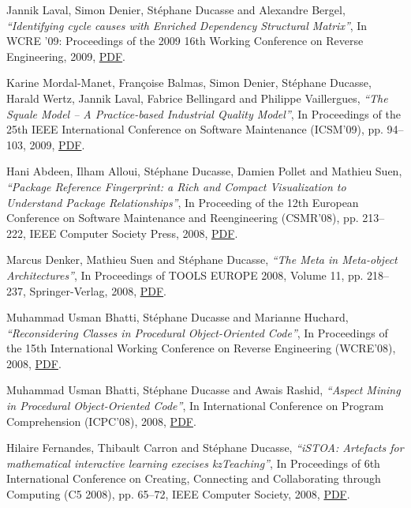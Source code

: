 \documentclass{article}
\newcommand{\czauthors}[1]{#1}
\newcommand{\cztitle}[1]{\emph{``#1''}}
\newcommand{\czbooktitle}[1]{#1}
\begin{document}
\begin{itemize}
	\pub  \czauthors{Jannik Laval, Simon Denier, St\'ephane Ducasse and Alexandre Bergel},  \cztitle{Identifying cycle causes with Enriched Dependency Structural Matrix},  In \czbooktitle{WCRE '09: Proceedings of the 2009 16th Working Conference on Reverse Engineering}, 2009, \href{http://rmod-files.lille.inria.fr/Team/Texts/Papers/Lava09c-WCRE2009-eDSM.pdf}{PDF}.

	\pub  \czauthors{Karine Mordal-Manet, Fran\c{c}oise Balmas, Simon Denier, St\'ephane Ducasse, Harald Wertz, Jannik Laval, Fabrice Bellingard and Philippe Vaillergues},  \cztitle{The Squale Model -- A Practice-based Industrial Quality Model},  In \czbooktitle{Proceedings of the 25th IEEE International Conference on Software Maintenance (ICSM'09)}, pp. 94--103, 2009, \href{http://rmod-files.lille.inria.fr/Team/Texts/Papers/Mord09a-ICSM2009-SqualeModel.pdf}{PDF}.

	\pub  \czauthors{Hani Abdeen, Ilham Alloui, St\'ephane Ducasse, Damien Pollet and Mathieu Suen},  \cztitle{Package Reference Fingerprint: a Rich and Compact Visualization to Understand Package Relationships},  In \czbooktitle{Proceeding of the 12th European Conference on Software Maintenance and Reengineering (CSMR'08)}, pp. 213--222, IEEE Computer Society Press, 2008, \href{http://rmod-files.lille.inria.fr/Team/Texts/Papers/Abde08b-CSMR2008-Fingerprint.pdf}{PDF}.

	\pub  \czauthors{Marcus Denker, Mathieu Suen and St\'ephane Ducasse},  \cztitle{The Meta in Meta-object Architectures},  In \czbooktitle{Proceedings of TOOLS EUROPE 2008}, Volume 11, pp. 218--237, Springer-Verlag, 2008, \href{http://rmod-files.lille.inria.fr/Team/Texts/Papers/Denk08b-Tools08-MetaContext.pdf}{PDF}.

	\pub  \czauthors{Muhammad Usman Bhatti, St\'ephane Ducasse and Marianne Huchard},  \cztitle{Reconsidering Classes in Procedural Object-Oriented Code},  In \czbooktitle{Proceedings of the 15th International Working Conference on Reverse Engineering (WCRE'08)}, 2008, \href{http://rmod-files.lille.inria.fr/Team/Texts/Papers/Bhat08b-WCRE2008-ObjectIdentification.pdf}{PDF}.

	\pub  \czauthors{Muhammad Usman Bhatti, St\'ephane Ducasse and Awais Rashid},  \cztitle{Aspect Mining in Procedural Object-Oriented Code},  In \czbooktitle{International Conference on Program Comprehension (ICPC'08)}, 2008, \href{http://rmod-files.lille.inria.fr/Team/Texts/Papers/Bhat08a-ICPC2008-AspectMining.pdf}{PDF}.

	\pub  \czauthors{Hilaire Fernandes, Thibault Carron and St\'ephane Ducasse},  \cztitle{iSTOA: Artefacts for mathematical interactive learning execises kzTeaching},  In \czbooktitle{Proceedings of 6th International Conference on Creating, Connecting and Collaborating through Computing (C5 2008)}, pp. 65--72, IEEE Computer Society, 2008, \href{http://rmod-files.lille.inria.fr/Team/Texts/Papers/Fern08a-C5-istoa-exercises.pdf}{PDF}.


\end{itemize}
\end{document}
